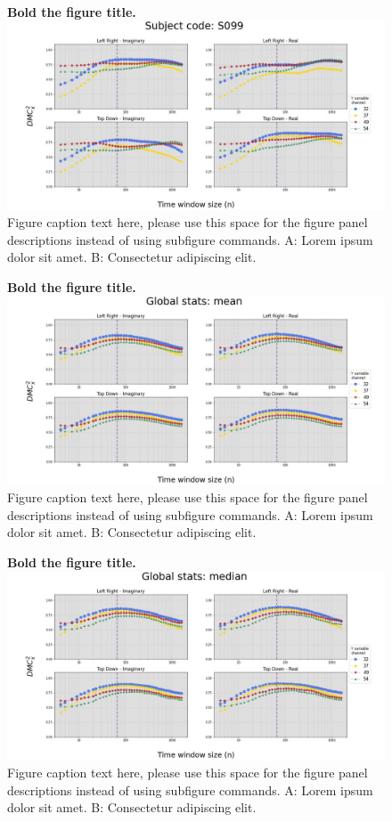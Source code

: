 \documentclass[10pt,letterpaper]{article}
\begin{document}
\begin{figure}[!h]
    \caption{{\bf Bold the figure title.}
    \includegraphics[width=.9\textwidth]{../output/figs/stats/S099.jpg}
      Figure caption text here, please use this space for the figure panel descriptions instead of using subfigure commands. A: Lorem ipsum dolor sit amet. B: Consectetur adipiscing elit.}
    \label{fig:4ts99}
\end{figure}


\begin{figure}[!h]
    \caption{{\bf Bold the figure title.}
    \includegraphics[width=.9\textwidth]{../output/figs/global/mean.jpg}
      Figure caption text here, please use this space for the figure panel descriptions instead of using subfigure commands. A: Lorem ipsum dolor sit amet. B: Consectetur adipiscing elit.}
      \label{fig:glob_mean}
\end{figure}


\begin{figure}[!h]
    \caption{{\bf Bold the figure title.}
    \includegraphics[width=.9\textwidth]{../output/figs/global/median.jpg}
      Figure caption text here, please use this space for the figure panel descriptions instead of using subfigure commands. A: Lorem ipsum dolor sit amet. B: Consectetur adipiscing elit.}
    \label{fig:glob_median}
\end{figure}
\end{document}
